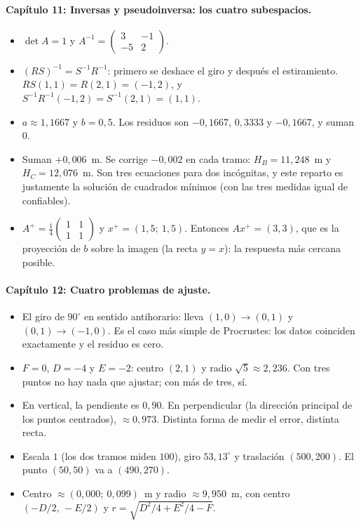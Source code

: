 \paragraph{Capítulo 11: Inversas y pseudoinversa: los cuatro subespacios.}
\begin{itemize}
  \item[\ref{pb:11-1}] \(\det A=1\) y \(A^{-1}=\begin{pmatrix}3&-1\\-5&2\end{pmatrix}\).
  \item[\ref{pb:11-2}] \((RS)^{-1}=S^{-1}R^{-1}\): primero se deshace el giro y después el estiramiento. \(RS(1,1)=R(2,1)=(-1,2)\), y \(S^{-1}R^{-1}(-1,2)=S^{-1}(2,1)=(1,1)\).
  \item[\ref{pb:11-3}] \(a\approx1{,}1667\) y \(b=0{,}5\). Los residuos son \(-0{,}1667\), \(0{,}3333\) y \(-0{,}1667\), y suman \(0\).
  \item[\ref{pb:11-4}] Suman \(+0{,}006\)~m. Se corrige \(-0{,}002\) en cada tramo: \(H_B=11{,}248\)~m y \(H_C=12{,}076\)~m. Son tres ecuaciones para dos incógnitas, y este reparto es justamente la solución de cuadrados mínimos (con las tres medidas igual de confiables).
  \item[\ref{pb:11-5}] \(A^+=\tfrac14\begin{pmatrix}1&1\\1&1\end{pmatrix}\) y \(x^+=(1{,}5;\ 1{,}5)\). Entonces \(Ax^+=(3,3)\), que es la proyección de \(b\) sobre la imagen (la recta \(y=x\)): la respuesta más cercana posible.
\end{itemize}

\paragraph{Capítulo 12: Cuatro problemas de ajuste.}
\begin{itemize}
  \item[\ref{pb:12-1}] El giro de \(90^\circ\) en sentido antihorario: lleva \((1,0)\to(0,1)\) y \((0,1)\to(-1,0)\). Es el caso más simple de Procrustes: los datos coinciden exactamente y el residuo es cero.
  \item[\ref{pb:12-2}] \(F=0\), \(D=-4\) y \(E=-2\): centro \((2,1)\) y radio \(\sqrt5\approx2{,}236\). Con tres puntos no hay nada que ajustar; con más de tres, sí.
  \item[\ref{pb:12-3}] En vertical, la pendiente es \(0{,}90\). En perpendicular (la dirección principal de los puntos centrados), \(\approx0{,}973\). Distinta forma de medir el error, distinta recta.
  \item[\ref{pb:12-4}] Escala \(1\) (los dos tramos miden \(100\)), giro \(53{,}13^\circ\) y traslación \((500,200)\). El punto \((50,50)\) va a \((490,270)\).
  \item[\ref{pb:12-5}] Centro \(\approx(0{,}000;\ 0{,}099)\)~m y radio \(\approx9{,}950\)~m, con centro \((-D/2,\,-E/2)\) y \(r=\sqrt{D^2/4+E^2/4-F}\).
\end{itemize}

